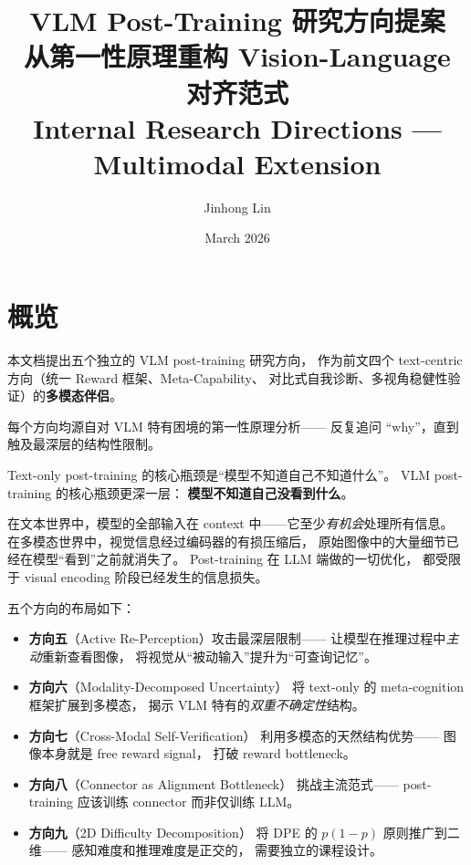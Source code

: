 \documentclass[12pt,a4paper]{article}
\title{\textbf{VLM Post-Training 研究方向提案}\\
\large{从第一性原理重构 Vision-Language 对齐范式}\\[6pt]
\normalsize{Internal Research Directions --- Multimodal Extension}}
\author{Jinhong Lin}
\date{March 2026}
\begin{document}
\maketitle

\section*{概览}

本文档提出五个独立的 VLM post-training 研究方向，
作为前文四个 text-centric 方向（统一 Reward 框架、Meta-Capability、
对比式自我诊断、多视角稳健性验证）的\textbf{多模态伴侣}。

每个方向均源自对 VLM 特有困境的第一性原理分析——
反复追问 ``why''，直到触及最深层的结构性限制。

\begin{insightbox}
Text-only post-training 的核心瓶颈是``模型不知道自己不知道什么''。
VLM post-training 的核心瓶颈更深一层：
\textbf{模型不知道自己没看到什么}。

在文本世界中，模型的全部输入在 context 中——它至少\textit{有机会}处理所有信息。
在多模态世界中，视觉信息经过编码器的有损压缩后，
原始图像中的大量细节已经在模型``看到''之前就消失了。
Post-training 在 LLM 端做的一切优化，
都受限于 visual encoding 阶段已经发生的信息损失。
\end{insightbox}

\noindent
五个方向的布局如下：
\begin{itemize}[leftmargin=2em]
  \item \textbf{方向五}（Active Re-Perception）攻击最深层限制——
    让模型在推理过程中\textit{主动}重新查看图像，
    将视觉从``被动输入''提升为``可查询记忆''。
  \item \textbf{方向六}（Modality-Decomposed Uncertainty）
    将 text-only 的 meta-cognition 框架扩展到多模态，
    揭示 VLM 特有的\textit{双重不确定性}结构。
  \item \textbf{方向七}（Cross-Modal Self-Verification）
    利用多模态的天然结构优势——
    图像本身就是 free reward signal，
    打破 reward bottleneck。
  \item \textbf{方向八}（Connector as Alignment Bottleneck）
    挑战主流范式——
    post-training 应该训练 connector 而非仅训练 LLM。
  \item \textbf{方向九}（2D Difficulty Decomposition）
    将 DPE 的 $p(1-p)$ 原则推广到二维——
    感知难度和推理难度是正交的，
    需要独立的课程设计。
\end{itemize}
\end{document}
